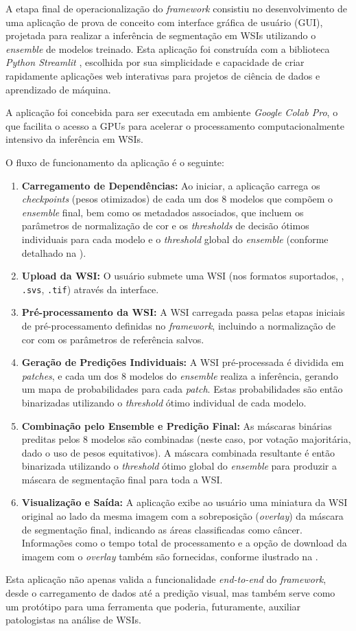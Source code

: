 A etapa final de operacionalização do \textit{framework} consistiu no desenvolvimento de uma aplicação de prova de conceito com interface gráfica de usuário (GUI), projetada para realizar a inferência de segmentação em WSIs utilizando o \textit{ensemble} de modelos treinado. Esta aplicação foi construída com a biblioteca \textit{Python Streamlit} \cite{Streamlit}, escolhida por sua simplicidade e capacidade de criar rapidamente aplicações web interativas para projetos de ciência de dados e aprendizado de máquina.

A aplicação foi concebida para ser executada em ambiente \textit{Google Colab Pro}, o que facilita o acesso a GPUs para acelerar o processamento computacionalmente intensivo da inferência em WSIs.

O fluxo de funcionamento da aplicação é o seguinte:
\begin{enumerate}
    \item \textbf{Carregamento de Dependências:} Ao iniciar, a aplicação carrega os \textit{checkpoints} (pesos otimizados) de cada um dos 8 modelos que compõem o \textit{ensemble} final, bem como os metadados associados, que incluem os parâmetros de normalização de cor e os \textit{thresholds} de decisão ótimos individuais para cada modelo e o \textit{threshold} global do \textit{ensemble} (conforme detalhado na ).
    \item \textbf{Upload da WSI:} O usuário submete uma WSI (nos formatos suportados, \eg, \texttt{.svs}, \texttt{.tif}) através da interface.
    \item \textbf{Pré-processamento da WSI:} A WSI carregada passa pelas etapas iniciais de pré-processamento definidas no \textit{framework}, incluindo a normalização de cor com os parâmetros de referência salvos.
    \item \textbf{Geração de Predições Individuais:} A WSI pré-processada é dividida em \textit{patches}, e cada um dos 8 modelos do \textit{ensemble} realiza a inferência, gerando um mapa de probabilidades para cada \textit{patch}. Estas probabilidades são então binarizadas utilizando o \textit{threshold} ótimo individual de cada modelo.
    \item \textbf{Combinação pelo Ensemble e Predição Final:} As máscaras binárias preditas pelos 8 modelos são combinadas (neste caso, por votação majoritária, dado o uso de pesos equitativos). A máscara combinada resultante é então binarizada utilizando o \textit{threshold} ótimo global do \textit{ensemble} para produzir a máscara de segmentação final para toda a WSI.
    \item \textbf{Visualização e Saída:} A aplicação exibe ao usuário uma miniatura da WSI original ao lado da mesma imagem com a sobreposição (\textit{overlay}) da máscara de segmentação final, indicando as áreas classificadas como câncer. Informações como o tempo total de processamento e a opção de download da imagem com o \textit{overlay} também são fornecidas, conforme ilustrado na .
\end{enumerate}
Esta aplicação não apenas valida a funcionalidade \textit{end-to-end} do \textit{framework}, desde o carregamento de dados até a predição visual, mas também serve como um protótipo para uma ferramenta que poderia, futuramente, auxiliar patologistas na análise de WSIs.
